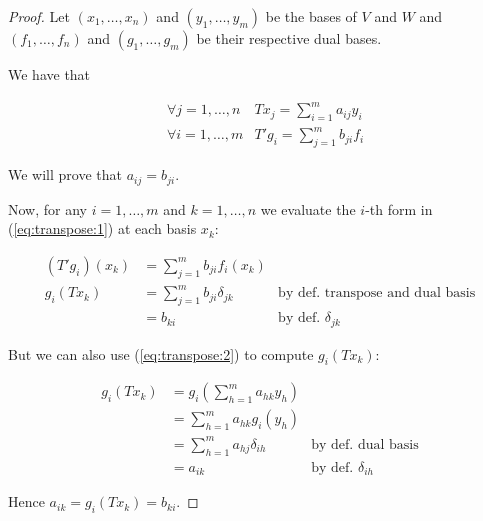 \documentclass[10pt]{extarticle}
\begin{document}
\begin{proof}
    Let $(x_1, \dots, x_n)$ and $(y_1, \dots, y_m)$ be the bases of $V$ and $W$
    and $(f_1, \dots, f_n)$ and $(g_1, \dots, g_m)$ be their respective dual bases.

    We have that

    \begin{align}
         & \forall j = 1, \dots, n & Tx_j = \sum^m_{i=1} a_{ij}y_i   \label{eq:transpose:1} \\
         & \forall i = 1, \dots, m & T'g_i = \sum^m_{j=1} b_{ji}f_i \label{eq:transpose:2}
    \end{align}

    We will prove that $a_{ij} = b_{ji}$.

    Now, for any $i = 1, \dots, m$ and $k = 1, \dots, n$ we evaluate the $i$-th form in
    (\ref{eq:transpose:1}) at each basis $x_k$:

    \begin{align*}
        (T'g_i)(x_k) & = \sum^m_{j=1} b_{ji}f_i(x_k)     &                                         \\
        g_i(Tx_k)    & = \sum^m_{j=1} b_{ji} \delta_{jk} & \text{by def. transpose and dual basis} \\
                     & = b_{ki}                          & \text{by def. } \delta_{jk}
    \end{align*}

    But we can also use (\ref{eq:transpose:2}) to compute $g_i(Tx_k)$:

    \begin{align*}
        g_i(Tx_k) & = g_i \left(\sum^m_{h=1} a_{hk} y_h \right) &                             \\
                  & = \sum^m_{h=1} a_{hk} g_i(y_h)              &                             \\
                  & = \sum^m_{h=1} a_{hj} \delta_{ih}           & \text{by def. dual basis}   \\
                  & = a_{ik}                                    & \text{by def. } \delta_{ih}
    \end{align*}

    Hence $a_{ik} = g_i(Tx_k) = b_{ki}$.
\end{proof}
\end{document}

